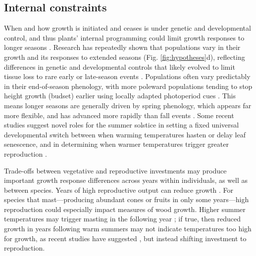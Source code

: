 \documentclass[11pt]{article}
\begin{document}
\subsection*{Internal constraints}
When and how growth is initiated and ceases is under genetic and developmental control, and thus plants' internal programming could limit growth responses to longer seasons \citep{howe2003genotype}. Research has repeatedly shown that populations vary in their growth and its responses to extended seasons (Fig. \ref{fig:hypotheses}d), reflecting differences in genetic and developmental controls that likely evolved to limit tissue loss to rare early or late-season events \citep{mitton2012mountain,lange2006thresholds,cleland2024effects}. Populations often vary predictably in their end-of-season phenology, with more poleward populations tending to stop height growth (budset) earlier using locally adapted photoperiod cues \citep{soolanayakanahally2013timing,aitken2016}. This means longer seasons are generally driven by spring phenology, which appears far more flexible, and has advanced more rapidly than fall events \citep{aitken2016}. Some recent studies suggest novel roles for the summer solstice \citep{zohner2023effect} in setting a fixed universal developmental switch between when warming temperatures hasten or delay leaf senescence, and in determining when warmer temperatures trigger greater reproduction \citep{Journe2024}. %

Trade-offs between vegetative and reproductive investments may produce important growth response differences across years within individuals, as well as between species. Years of high reproductive output can reduce growth \citep{thomas2011bookchptr,hacket2016tree}. For species that mast---producing abundant cones or fruits in only some years---high reproduction could especially impact measures of wood growth. Higher summer temperatures may trigger masting in the following year \citep{hacket2016tree,hacket2016consistent}; if true, then reduced growth in years following warm summers may not indicate temperatures too high for growth, as recent studies have suggested \citep[e.g.][]{gantois2022new,dow2022warm}, but instead shifting investment to reproduction.
\end{document}
